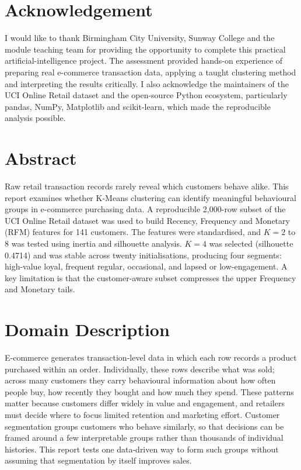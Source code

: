 \documentclass[11pt,a4paper]{article}
\begin{document}
\listoffigures
\vspace{1.0cm}
\listoftables
\clearpage

\section*{Acknowledgement}
I would like to thank Birmingham City University, Sunway College and the module teaching team for providing the opportunity to complete this practical artificial-intelligence project. The assessment provided hands-on experience of preparing real e-commerce transaction data, applying a taught clustering method and interpreting the results critically. I also acknowledge the maintainers of the UCI Online Retail dataset and the open-source Python ecosystem, particularly pandas, NumPy, Matplotlib and scikit-learn, which made the reproducible analysis possible.
\clearpage

\section*{Abstract}
Raw retail transaction records rarely reveal which customers behave alike. This report examines whether K-Means clustering can identify meaningful behavioural groups in e-commerce purchasing data. A reproducible 2,000-row subset of the UCI Online Retail dataset was used to build Recency, Frequency and Monetary (RFM) features for 141 customers. The features were standardised, and $K=2$ to $8$ was tested using inertia and silhouette analysis. $K=4$ was selected (silhouette 0.4714) and was stable across twenty initialisations, producing four segments: high-value loyal, frequent regular, occasional, and lapsed or low-engagement. A key limitation is that the customer-aware subset compresses the upper Frequency and Monetary tails.
\clearpage

\section{Domain Description}
E-commerce generates transaction-level data in which each row records a product purchased within an order. Individually, these rows describe what was sold; across many customers they carry behavioural information about how often people buy, how recently they bought and how much they spend. These patterns matter because customers differ widely in value and engagement, and retailers must decide where to focus limited retention and marketing effort. Customer segmentation groups customers who behave similarly, so that decisions can be framed around a few interpretable groups rather than thousands of individual histories. This report tests one data-driven way to form such groups without assuming that segmentation by itself improves sales.
\end{document}
